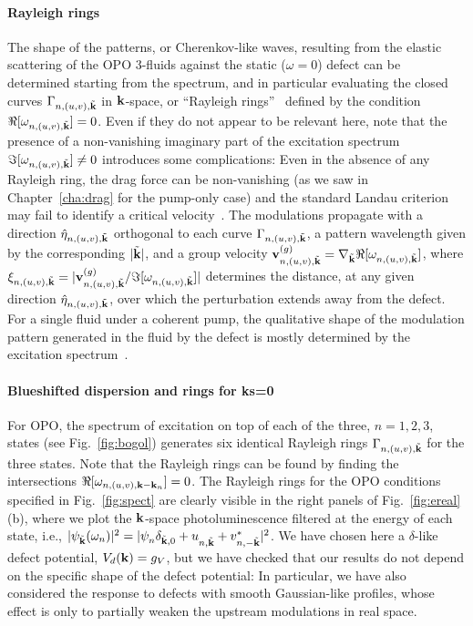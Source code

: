 \paragraph{Rayleigh rings}
The shape of the patterns, or Cherenkov-like waves, resulting from the
elastic scattering of the OPO 3-fluids against the static ($\omega=0$)
defect can be determined starting from the spectrum, and in particular
evaluating the closed curves $\Gamma_{n,(u,v), \tilde{\mathbf{k}}}$ in
$\mathbf{k}$-space, or ``Rayleigh rings''~\cite{9783319002651} defined by
the condition $\Re[\omega_{n,(u,v), \tilde{\mathbf{k}}}] = 0$. Even if
they do not appear to be relevant here, note that the presence of a
non-vanishing imaginary part of the excitation spectrum
$\Im[\omega_{n,(u,v),\tilde{\mathbf{k}}}]\neq 0$ introduces some
complications: Even in the absence of any Rayleigh ring, the drag
force can be non-vanishing (as we saw in Chapter~\ref{cha:drag} for
the pump-only case) and the standard Landau criterion may fail to
identify a critical velocity~\cite{Wouters_2010}.
%
The modulations propagate with a direction
$\hat{\eta}_{n,(u,v),\tilde{\mathbf{k}}}$ orthogonal to each curve
$\Gamma_{n,(u,v), \tilde{\mathbf{k}}}$, a pattern wavelength given by
the corresponding $|\tilde{\mathbf{k}}|$, and a group velocity
$\mathbf{v}_{n,(u,v),\tilde{\mathbf{k}}}^{(g)}=\nabla_{\tilde{\mathbf{k}}}
\Re[\omega_{n,(u,v), \tilde{\mathbf{k}}}]$, where
$\xi_{n,(u,v),\tilde{\mathbf{k}}} =
|\mathbf{v}_{n,(u,v),\tilde{\mathbf{k}}}^{(g)} / \Im[\omega_{n,(u,v),
  \tilde{\mathbf{k}}}]|$ determines the distance, at any given direction
$\hat{\eta}_{n,(u,v),\tilde{\mathbf{k}}}$, over which the perturbation
extends away from the defect. For a single fluid under a coherent
pump, the qualitative shape of the modulation pattern generated in the
fluid by the defect is mostly determined by the excitation
spectrum~\cite{Carusotto_2006,Carusotto_2004}.



\paragraph{Blueshifted dispersion and rings for ks=0}
For OPO, the spectrum of excitation on top of each of the three,
$n=1,2,3$, states (see Fig.~\ref{fig:bogol}) generates six identical
Rayleigh rings $\Gamma_{n,(u,v), \tilde{\mathbf{k}}}$ for the three
states. Note that the Rayleigh rings can be found by finding the
intersections $\Re[\omega_{n,(u,v),\mathbf{k}-\mathbf{k}_n}]=0$.
%
The Rayleigh rings for the OPO conditions specified in
Fig.~\ref{fig:spect} are clearly visible in the right panels of
Fig.~\ref{fig:ereal} (b), where we plot the $\mathbf{k}$-space
photoluminescence filtered at the energy of each state, i.e.,
$|\psi_{\tilde{\mathbf{k}}} (\omega_n)|^2= |\psi_{n}^{}
\delta_{\tilde{\mathbf{k}},0} + u_{n,\tilde{\mathbf{k}}}^{} +
v^*_{n,-\tilde{\mathbf{k}}}|^2$.
%
We have chosen here a $\delta$-like defect potential,
$V_d(\mathbf{k}) = g_V$, but we have checked that our results do not
depend on the specific shape of the defect potential: In particular,
we have also considered the response to defects with smooth
Gaussian-like profiles, whose effect is only to partially weaken the
upstream modulations in real space.

